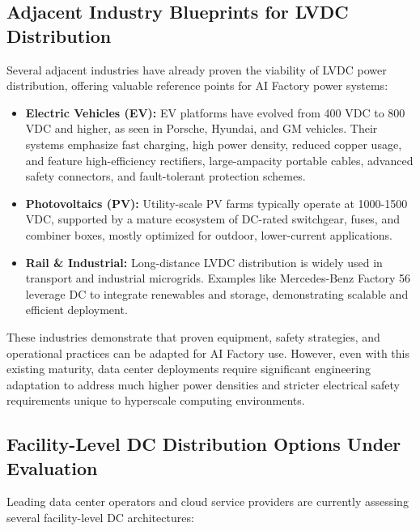 \subsection*{Adjacent Industry Blueprints for LVDC Distribution}

Several adjacent industries have already proven the viability of LVDC power distribution, offering valuable reference points for AI Factory power systems:

\begin{itemize}
\item \textbf{Electric Vehicles (EV):} EV platforms have evolved from 400 VDC to 800 VDC and higher, as seen in Porsche, Hyundai, and GM vehicles. Their systems emphasize fast charging, high power density, reduced copper usage, and feature high-efficiency rectifiers, large-ampacity portable cables, advanced safety connectors, and fault-tolerant protection schemes.

\item \textbf{Photovoltaics (PV):} Utility-scale PV farms typically operate at 1000-1500 VDC, supported by a mature ecosystem of DC-rated switchgear, fuses, and combiner boxes, mostly optimized for outdoor, lower-current applications.

\item \textbf{Rail \& Industrial:} Long-distance LVDC distribution is widely used in transport and industrial microgrids. Examples like Mercedes-Benz Factory 56 leverage DC to integrate renewables and storage, demonstrating scalable and efficient deployment.
\end{itemize}

These industries demonstrate that proven equipment, safety strategies, and operational practices can be adapted for AI Factory use. However, even with this existing maturity, data center deployments require significant engineering adaptation to address much higher power densities and stricter electrical safety requirements unique to hyperscale computing environments.

\subsection*{Facility-Level DC Distribution Options Under Evaluation}

Leading data center operators and cloud service providers are currently assessing several facility-level DC architectures:

